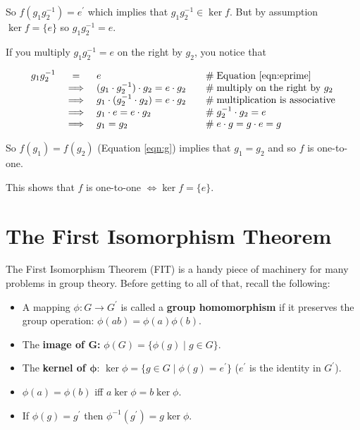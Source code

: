 \documentclass[11pt, oneside]{article}   	%
\theoremstyle{definition}
\begin{document}
\begin{itemize}
So $f(g_1g_2^{-1}) = e^\prime$ which implies that  $g_1g_2^{-1} \in \ker f$. But by assumption $\ker f = \{e\}$ so $g_1g_2^{-1}  = e$. 

If you multiply $g_1g_2^{-1}  = e$  on the right by $g_2$, you notice that 

\begin{equation*}
\begin{array}{rcll}
g_1g_2^{-1}
&=& e                                                                                     &\quad \mathrel{\#} \text{Equation \ref{eqn:eprime}}   \\
&\implies&  (g_1 \cdot g_2^{-1}) \cdot g_2 = e \cdot g_2         &\quad \mathrel{\#} \text{multiply on the right by $g_2$} \\
&\implies&  g_1 \cdot  (g_2^{-1} \cdot g_2) = e \cdot g_2      &\quad \mathrel{\#} \text{multiplication is associative} \\
&\implies&  g_1 \cdot e = e \cdot g_2                                    &\quad \mathrel{\#} g_2^{-1} \cdot g_2 = e \\
&\implies&  g_1 =  g_2                                                           &\quad \mathrel{\#} e \cdot g = g \cdot e = g
\end{array}
\end{equation*}


So $f(g_1) = f(g_2)$ (Equation \ref{eqn:g}) implies that $g_1 = g_2$ and so $f$ is one-to-one. 
\end{itemize}

This shows that $f$ is one-to-one  $\iff \ker f =\{e\}$.

\section{The First Isomorphism Theorem}
The First Isomorphism Theorem (FIT) is a handy piece of machinery for many problems in group theory. Before getting to all of that, recall the following:

\begin{itemize}
\item A mapping $\phi: G \rightarrow G^\prime$ is called a \textbf{group homomorphism} if it preserves the group operation: $\phi(ab) = \phi(a)\phi(b)$.
\item The \textbf{image of $\mathbf{G}$:}  $\phi(G) = \{\phi(g) \mid g \in G\}$.
\item The \textbf{kernel of $\boldsymbol{\phi}$}: $\ker \phi = \{g \in G \mid \phi(g) = e^\prime\}$  ($e^\prime$ is the identity in $G^\prime$).
\item $\phi(a) = \phi(b)$ iff $a \ker \phi = b \ker \phi$.
\item If $\phi(g) = g^\prime$ then $\phi^{-1}(g^{\prime}) = g \ker \phi$.
\end{itemize}
\end{document}
